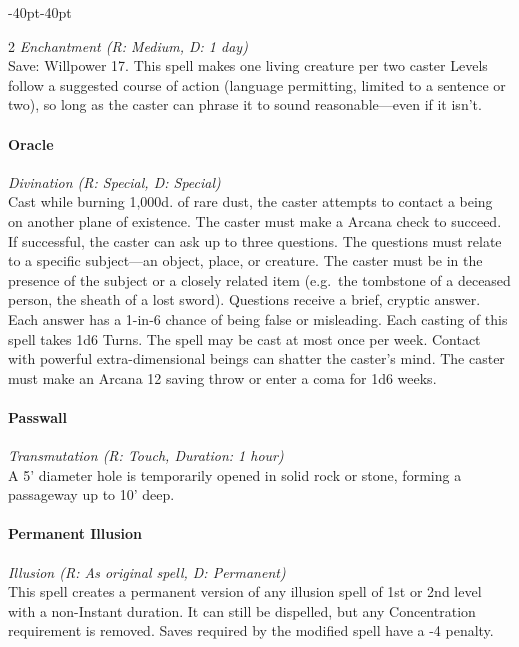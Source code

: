 \documentclass{book}
\begin{document}
\begin{adjustwidth}{-40pt}{-40pt}
\begin{multicols}{2}
\emph{Enchantment (R: Medium, D: 1 day)}\\
Save: Willpower 17. This spell makes one living creature per two caster
Levels follow a suggested course of action (language permitting, limited
to a sentence or two), so long as the caster can phrase it to sound
reasonable---even if it isn't.

\paragraph{Oracle}\label{oracle}

\emph{Divination (R: Special, D: Special)}\\
Cast while burning 1,000d. of rare dust, the caster attempts to contact
a being on another plane of existence. The caster must make a Arcana
check to succeed. If successful, the caster can ask up to three
questions. The questions must relate to a specific subject---an object,
place, or creature. The caster must be in the presence of the subject or
a closely related item (e.g.~the tombstone of a deceased person, the
sheath of a lost sword). Questions receive a brief, cryptic answer. Each
answer has a 1-in-6 chance of being false or misleading. Each casting of
this spell takes 1d6 Turns. The spell may be cast at most once per week.
Contact with powerful extra-dimensional beings can shatter the caster's
mind. The caster must make an Arcana 12 saving throw or enter a coma for
1d6 weeks.

\paragraph{Passwall}\label{passwall}

\emph{Transmutation (R: Touch, Duration: 1 hour)}\\
A 5' diameter hole is temporarily opened in solid rock or stone, forming
a passageway up to 10' deep.

\paragraph{Permanent Illusion}\label{permanent-illusion}

\emph{Illusion (R: As original spell, D: Permanent)}\\
This spell creates a permanent version of any illusion spell of 1st or
2nd level with a non-Instant duration. It can still be dispelled, but
any Concentration requirement is removed. Saves required by the modified
spell have a -4 penalty.


\end{multicols}
\end{adjustwidth}
\end{document}
